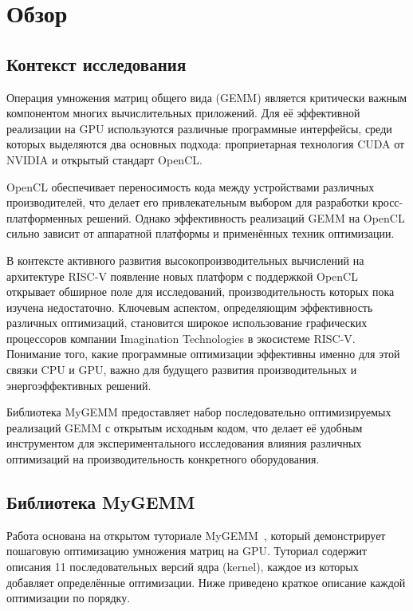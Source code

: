 
\section{Обзор}
\label{sec:relatedworks}

\subsection{Контекст исследования}

Операция умножения матриц общего вида (GEMM) является критически важным компонентом многих вычислительных приложений. Для её эффективной реализации на GPU используются различные программные интерфейсы, среди которых выделяются два основных подхода: проприетарная технология CUDA от NVIDIA и открытый стандарт OpenCL.

OpenCL обеспечивает переносимость кода между устройствами различных производителей, что делает его привлекательным выбором для разработки кросс-платформенных решений. Однако эффективность реализаций GEMM на OpenCL сильно зависит от аппаратной платформы и применённых техник оптимизации.

В контексте активного развития высокопроизводительных вычислений на архитектуре RISC-V появление новых платформ с поддержкой OpenCL открывает обширное поле для исследований, производительность которых пока изучена недостаточно. Ключевым аспектом, определяющим эффективность различных оптимизаций, становится широкое использование графических процессоров компании Imagination Technologies в экосистеме RISC-V. Понимание того, какие программные оптимизации эффективны именно для этой связки CPU и GPU, важно для будущего развития производительных и энергоэффективных решений.

Библиотека MyGEMM предоставляет набор последовательно оптимизируемых реализаций GEMM с открытым исходным кодом, что делает её удобным инструментом для экспериментального исследования влияния различных оптимизаций на производительность конкретного оборудования.

\subsection{Библиотека MyGEMM}

Работа основана на открытом туториале MyGEMM~\cite{nugteren2018mygemm}, который демонстрирует пошаговую оптимизацию умножения матриц на GPU. Туториал содержит описания 11 последовательных версий ядра (kernel), каждое из которых добавляет определённые оптимизации. Ниже приведено краткое описание каждой оптимизации по порядку.

